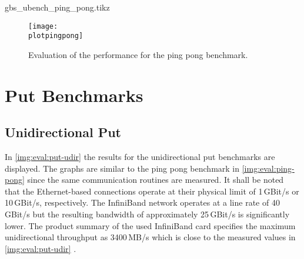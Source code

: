 \newcommand{\plotpingpong}{gbs_ubench_ping_pong.tikz}
\begin{filecontents}{\plotpingpong}
\newcommand{\csv}{gbs_ubench_ping_pong.csv}
\newcommand{\csvgi}{result-gi/\csv}
\newcommand{\csvte}{result-te/\csv}
\newcommand{\csvipoib}{result-ipoib/\csv}
\newcommand{\csvib}{result-ib/\csv}

\end{filecontents}

\begin{figure}[htb]
\centering
\texttt{[image: \\plotpingpong]}
\caption{Evaluation of the performance for the ping pong benchmark.}
\label{img:eval:ping-pong}
\end{figure}


\section{Put Benchmarks}
\subsection{Unidirectional Put}

In \autoref{img:eval:put-udir} the results for the unidirectional put benchmarks are displayed. The graphs are similar to the ping pong benchmark in \autoref{img:eval:ping-pong} since the same communication routines are measured. It shall be noted that the Ethernet-based connections operate at their physical limit of 1\,GBit/s or 10\,GBit/s, respectively. The InfiniBand network operates at a line rate of 40\,GBit/s but the resulting bandwidth of approximately 25\,GBit/s is significantly lower. The product summary of the used InfiniBand card 
specifies the maximum unidirectional throughput as 3400\,MB/s which is close to the measured values in \autoref{img:eval:put-udir} \cite{ib-card}.

